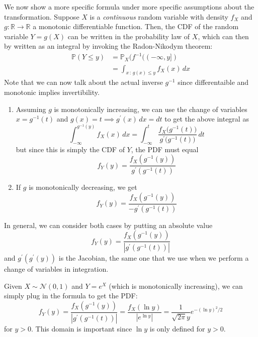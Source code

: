\documentclass{article}
\begin{document}
      We now show a more specific formula under more specific assumptions about the transformation. Suppose $X$ is a \textit{continuous} random variable with density $f_X$ and $g: \mathbb{R} \rightarrow \mathbb{R}$ a monotonic differentiable function. Then, the CDF of the random variable $Y = g(X)$ can be written in the probability law of $X$, which can then by written as an integral by invoking the Radon-Nikodym theorem: 
      \begin{align*}
        \mathbb{P}(Y \leq y) & = \mathbb{P}_X (f^{-1} ((-\infty, y]) \\
        & = \int_{x \,:\, g(x) \leq y} f_X (x) \,dx
      \end{align*}
      Note that we can now talk about the actual inverse $g^{-1}$ since differentaible and monotonic implies invertibility. 
      \begin{enumerate}
        \item Assuming $g$ is monotonically increasing, we can use the change of variables $x = g^{-1} (t)$ and $g(x) = t \implies g^\prime (x) \,dx = dt$ to get the above integral as 
        \begin{equation}
          \int_{-\infty}^{g^{-1} (y)} f_X (x) \,dx = \int_{-\infty}^t \frac{f_X \big( g^{-1} (t) \big)}{g^\prime \big( g^{-1} (t)\big)} \,dt 
        \end{equation}
        but since this is simply the CDF of $Y$, the PDF must equal 
        \begin{equation}
          f_Y (y) = \frac{f_X (g^{-1} (y) )}{g^\prime (g^{-1} (t))}
        \end{equation}
        \item If $g$ is monotonically decreasing, we get 
        \begin{equation}
          f_Y (y) = \frac{f_X (g^{-1} (y) )}{- g^\prime (g^{-1} (t))}
        \end{equation}
      \end{enumerate}
      In general, we can consider both cases by putting an absolute value 
      \begin{equation}
        f_Y (y) = \frac{f_X (g^{-1} (y) )}{|g^\prime (g^{-1} (t))|}
      \end{equation}
      and $g^\prime (g^\prime (y))$ is the Jacobian, the same one that we use when we perform a change of variables in integration. 

      \begin{example}
        Given $X \sim \mathcal{N}(0, 1)$ and $Y = e^X$ (which is monotonically increasing), we can simply plug in the formula to get the PDF: 
        \begin{equation}
          f_Y (y) = \frac{f_X (g^{-1} (y) )}{|g^\prime (g^{-1} (t))|} = \frac{f_X (\ln{y}) }{ | e^{\ln{y}} |} = \frac{1}{\sqrt{2 \pi} y} e^{-(\ln{y})^2 / 2}
        \end{equation}
        for $y > 0$. This domain is important since $\ln{y}$ is only defined for $y > 0$. 
      \end{example}
\end{document}
